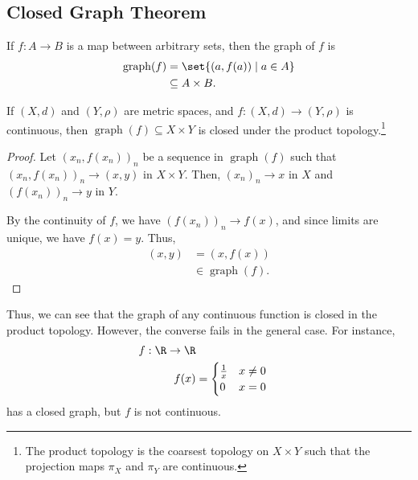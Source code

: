 \documentclass[10pt]{mypackage}
\DeclareMathOperator{\Graph}{graph}
\begin{document}
  \subsection{Closed Graph Theorem}%
  \begin{definition}
    If $f: A\rightarrow B$ is a map between arbitrary sets, then the graph of $f$ is
    \begin{align*}
      \Graph(f) &= \set{\left(a,f(a)\right)\mid a\in A}\\
                &\subseteq A\times B.
    \end{align*}
  \end{definition}
  \begin{proposition}
    If $\left(X,d\right)$ and $\left(Y,\rho\right)$ are metric spaces, and $f: \left(X,d\right)\rightarrow \left(Y,\rho\right)$ is continuous, then $\Graph(f) \subseteq X\times Y$ is closed under the product topology.\footnote{The product topology is the coarsest topology on $X\times Y$ such that the projection maps $\pi_X$ and $\pi_Y$ are continuous.}
  \end{proposition}
  \begin{proof}
    Let $\left(x_n,f\left(x_n\right)\right)_n$ be a sequence in $\Graph(f)$ such that $\left(x_n,f\left(x_n\right)\right)_n\rightarrow \left(x,y\right)$ in $X\times Y$. Then, $\left(x_n\right)_n \rightarrow x$ in $X$ and $\left(f\left(x_n\right)\right)_n\rightarrow y$ in $Y$.\newline

    By the continuity of $f$, we have $\left(f\left(x_n\right)\right)_n\rightarrow f(x)$, and since limits are unique, we have $f(x) = y$. Thus,
    \begin{align*}
      \left(x,y\right) &= \left(x,f(x)\right)\\
                       &\in \Graph(f).
    \end{align*}
  \end{proof}
  Thus, we can see that the graph of any continuous function is closed in the product topology. However, the converse fails in the general case. For instance,
  \begin{align*}
    f: \R\rightarrow \R\\
    f(x) &= \begin{cases}
      \frac{1}{x} & x\neq 0\\
      0 & x = 0
    \end{cases}
  \end{align*}
  has a closed graph, but $f$ is not continuous.\newline
\end{document}
